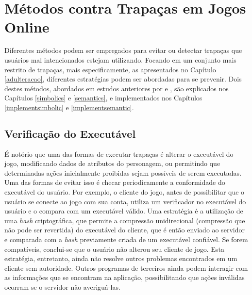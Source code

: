 \chapter{Métodos contra Trapaças em Jogos Online}
\label{cap:metodologias}

Diferentes métodos podem ser empregados para evitar ou detectar trapaças que usuários mal intencionados estejam utilizando. Focando em um conjunto mais restrito de trapaças, mais especificamente, as apresentados no Capítulo \ref{adulteracao}, diferentes estratégias podem ser abordadas para se prevenir. Dois destes métodos, abordados em estudos anteriores por \cite{NVE} e \cite{implementacaosimbolica}, são explicados nos Capítulos \ref{simbolics} e \ref{semantics}, e implementados nos Capítulos \ref{implementsimbolic} e \ref{implementsemantic}.

\section{Verificação do Executável}
É notório que uma das formas de executar trapaças é alterar o executável do jogo, modificando dados de atributos do personagem, ou permitindo que determinadas ações inicialmente proibidas sejam possíveis de serem executadas. 
Uma das formas de evitar isso é checar periodicamente a conformidade do executável do usuário. Por exemplo, o cliente do jogo, antes de possibilitar que o usuário se conecte ao jogo com sua conta, utiliza um verificador no executável do usuário e o compara com um executável válido. Uma estratégia é a utilização de uma \textit{hash} criptográfica, que permite a compressão unidirecional (compressão que não pode ser revertida) do executável do cliente, que é então enviado ao servidor e comparada com a \textit{hash} previamente criada de um executável confiável. Se forem compatíveis, conclui-se que o usuário não alterou seu cliente de jogo. Esta estratégia, entretanto, ainda não resolve outros problemas encontrados em um cliente sem autoridade. Outros programas de terceiros ainda podem interagir com as informações que se encontram na aplicação, possibilitando que ações inválidas ocorram se o servidor não averiguá-las. 


